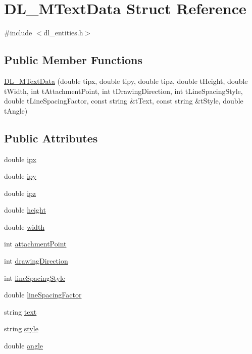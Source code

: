 \hypertarget{structDL__MTextData}{\section{D\-L\-\_\-\-M\-Text\-Data Struct Reference}
\label{structDL__MTextData}
}


{\ttfamily \#include $<$dl\-\_\-entities.\-h$>$}

\subsection*{Public Member Functions}
\begin{DoxyCompactItemize}
\item 
\hyperlink{structDL__MTextData_aa0b3f749682c02d36a64f0cd689a0b3f}{D\-L\-\_\-\-M\-Text\-Data} (double tipx, double tipy, double tipz, double t\-Height, double t\-Width, int t\-Attachment\-Point, int t\-Drawing\-Direction, int t\-Line\-Spacing\-Style, double t\-Line\-Spacing\-Factor, const string \&t\-Text, const string \&t\-Style, double t\-Angle)
\end{DoxyCompactItemize}
\subsection*{Public Attributes}
\begin{DoxyCompactItemize}
\item 
double \hyperlink{structDL__MTextData_a7a84e7b5b4c20640c79106b05d79b6ee}{ipx}
\item 
double \hyperlink{structDL__MTextData_aa0218b8bff8598c76780f44243fc5887}{ipy}
\item 
double \hyperlink{structDL__MTextData_a384d83a52321c544d788042c38c383d7}{ipz}
\item 
double \hyperlink{structDL__MTextData_af83188d35269d20e8932411ddaf1c3f8}{height}
\item 
double \hyperlink{structDL__MTextData_a8d9752165be599075d47a556523bd9ed}{width}
\item 
int \hyperlink{structDL__MTextData_a24fb080330a5bc368c8573fa05a716f9}{attachment\-Point}
\item 
int \hyperlink{structDL__MTextData_a897d0a20cd617e6d2786cff6b7b34f42}{drawing\-Direction}
\item 
int \hyperlink{structDL__MTextData_a57e0ad2a5b31bb9148de0b265ac01a5c}{line\-Spacing\-Style}
\item 
double \hyperlink{structDL__MTextData_a3ddfff66e486aaf4eb9541b0552b7023}{line\-Spacing\-Factor}
\item 
string \hyperlink{structDL__MTextData_a479b63c9fe89982988ddd337da37efb7}{text}
\item 
string \hyperlink{structDL__MTextData_acd375b6bbc8d0eddafa39faf28ee1862}{style}
\item 
double \hyperlink{structDL__MTextData_a339e3f5744ff0df98faf985b261b9d5a}{angle}
\end{DoxyCompactItemize}


